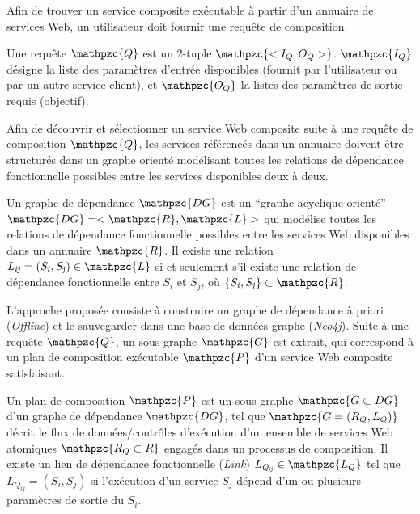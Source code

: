 Afin de trouver un service composite exécutable à partir d'un annuaire
de services Web, un utilisateur doit fournir une requête de
composition.\medskip

\begin{mydef}\label{def:ch3/request}
  Une requête $\mathpzc{Q}$ est un 2-tuple $\mathpzc{<I_Q, O_Q>}$.
  $\mathpzc{I_Q}$ désigne la liste des paramètres d'entrée disponibles
  (fournit par l'utilisateur ou par un autre service client), et
  $\mathpzc{O_Q}$ la listes des paramètres de sortie requis
  (objectif).
\end{mydef}

Afin de découvrir et sélectionner un service Web composite suite à une
requête de composition $\mathpzc{Q}$, les services référencés dans un
annuaire doivent être structurés dans un graphe orienté modélisant
toutes les relations de dépendance fonctionnelle possibles entre les
services disponibles deux à deux.\medskip



\begin{mydef}
  Un graphe de dépendance $\mathpzc{DG}$ est un ``graphe acyclique
  orienté'' $\mathpzc{DG}=<\mathpzc{R}, \mathpzc{L}>$ qui modélise
  toutes les relations de dépendance fonctionnelle possibles entre les
  services Web disponibles dans un annuaire $\mathpzc{R}$. Il existe
  une relation
  $\mathit{L_{ij}}=(\mathit{S_i}, \mathit{S_j}) \in \mathpzc{L}$ si et
  seulement s'il existe une relation de dépendance fonctionnelle entre
  $\mathit{S_i}$ et $\mathit{S_j}$, où
  $\{\mathit{S_i, S_j}\} \subset \mathpzc{R}$.\medskip
\end{mydef}

L'approche proposée consiste à construire un graphe de dépendance à
priori (\textit{Offline}) et le sauvegarder dans une base de données
graphe (\textit{Neo4j}). Suite à une requête $\mathpzc{Q}$, un
sous-graphe $\mathpzc{G}$ est extrait, qui correspond à un plan de
composition exécutable $\mathpzc{P}$ d'un service Web composite
satisfaisant.\medskip



\begin{mydef}
  Un plan de composition $\mathpzc{P}$ est un sous-graphe
  $\mathpzc{G \subset DG}$ d'un graphe de dépendance $\mathpzc{DG}$,
  tel que $\mathpzc{G=(R_Q,L_Q)}$ décrit le flux de données/contrôles
  d'exécution d'un ensemble de services Web atomiques
  $\mathpzc{R_Q \subset R}$ engagés dans un processus de
  composition. Il existe un lien de dépendance fonctionnelle
  (\textit{Link}) $\mathit{L_{Q_{ij}}} \in \mathpzc{L_Q}$ tel que
  $\mathit{L_{Q_{ij}}} = (S_i, S_j)$ si l'exécution d'un service
  $\mathit{S_j}$ dépend d'un ou plusieurs paramètres de sortie du
  $\mathit{S_i}$.\medskip
\end{mydef}


